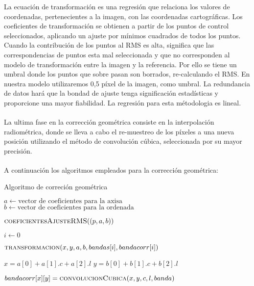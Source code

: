 La ecuaci\'on de transformaci\'on es una regresi\'on que relaciona los valores de coordenadas, pertenecientes a la imagen, con las coordenadas cartogr\'aficas. Los coeficientes de transformaci\'on se obtienen a partir de los puntos de control seleccionados, aplicando un ajuste por m\'inimos cuadrados de todos los puntos. Cuando la contribuci\'on de los puntos al RMS es alta, significa que las correspondencias de puntos esta mal seleccionada y que no corresponden al modelo de transformaci\'on entre la imagen y la referencia. Por ello se tiene un umbral donde los puntos que sobre pasan son borrados, re-calculando el RMS. En nuestra modelo utilizaremos 0,5 p\'ixel de la imagen, como umbral. La redundancia de datos har\'a que la bondad de ajuste tenga significaci\'on estad\'isticas y proporcione una mayor fiabilidad. La regresi\'on para esta m\'etodologia es lineal.\\~\\
La ultima fase en la correcci\'on geom\'etrica consiste en la interpolaci\'on radiom\'etrica, donde se lleva a cabo el re-muestreo de los p\'ixeles a una nueva posici\'on utilizando el m\'etodo de convoluci\'on c\'ubica, seleccionada por su mayor precisi\'on.\\~\\
A continuaci\'on los algoritmos empleados para la correcci\'on geom\'etrica:
\begin{algorithm}
	\caption{Algoritmo de correci\'on geom\'etrica}
	\label{alg:corrGEom}
	\begin{algorithmic}[1]
		\Statex
		
		\State $a \gets \text{vector de coeficientes para la axisa}$
		\State $b \gets \text{vector de coeficientes para la ordenada}$
		
		\State $\textsc{coeficientesAjusteRMS}((p,a,b))$
		
		\State 
		\State $i \gets 0$
		
					\State $\textsc{transformacion}(x,y,a,b,bandas[i],bandacorr[i])$
				\EndFor
			\EndFor
		\EndWhile
		
		\EndFunction
		
		\State
		\State
			\State $x = a[0]+a[1].c+a[2].l$
			\State $y = b[0]+b[1].c+b[2].l$
			
			\State $bandacorr[x][y]=\textsc{convolucionCubica}(x,y,c,l,banda)$
			
		\EndProcedure
	\end{algorithmic}
\end{algorithm}


